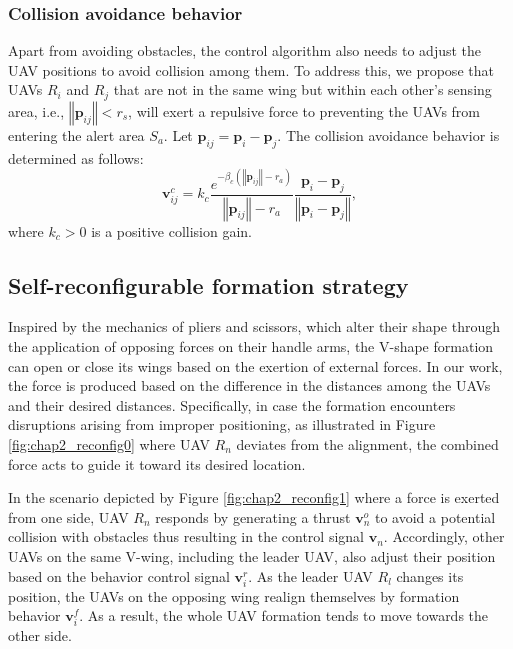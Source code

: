 \subsubsection{Collision avoidance behavior}
Apart from avoiding obstacles, the control algorithm also needs to adjust the UAV positions to avoid collision among them. To address this, we propose that UAVs $R_i$ and $R_j$ that are not in the same wing but within each other's sensing area, i.e., $\left\Vert \mathbf{p}_{ij}\right\Vert < r_{s}$, will exert a repulsive force to preventing the UAVs from entering the alert area $S_a$. Let $\mathbf{p}_{ij}=\mathbf{p}_i-\mathbf{p}_j$. The collision avoidance behavior is determined as follows:
\begin{equation}
    \mathbf{v}_{ij}^{c}=k_{c}\dfrac{e^{-\beta_{c}\left(\left\Vert \mathbf{p}_{ij}\right\Vert -r_{a}\right)}}{\left\Vert \mathbf{p}_{ij}\right\Vert -r_{a}}\dfrac{\mathbf{p}_i-\mathbf{p}_j}{\left\Vert \mathbf{p}_i-\mathbf{p}_j\right\Vert},
    \label{eqn:chap2_uc}
\end{equation}
where $k_c>0$ is a positive collision gain.


\subsection{Self-reconfigurable formation strategy} 
\label{sec:0reconfig}
Inspired by the mechanics of pliers and scissors, which alter their shape through the application of opposing forces on their handle arms, the V-shape formation can open or close its wings based on the exertion of external forces. In our work, the force is produced based on the difference in the distances among the UAVs and their desired distances. Specifically, in case the formation encounters disruptions arising from improper positioning, as illustrated in Figure \ref{fig:chap2_reconfig0} where UAV $R_n$ deviates from the alignment, the combined force acts to guide it toward its desired location.

In the scenario depicted by Figure \ref{fig:chap2_reconfig1} where a force is exerted from one side, UAV $R_n$ responds by generating a thrust $\mathbf{v}_n^o$ to avoid a potential collision with obstacles thus resulting in the control signal $\mathbf{v}_n$. Accordingly, other UAVs on the same V-wing, including the leader UAV, also adjust their position based on the behavior control signal $\mathbf{v}_i^r$. As the leader UAV $R_l$ changes its position, the UAVs on the opposing wing realign themselves by formation behavior $\mathbf{v}_i^f$. As a result, the whole UAV formation tends to move towards the other side.

